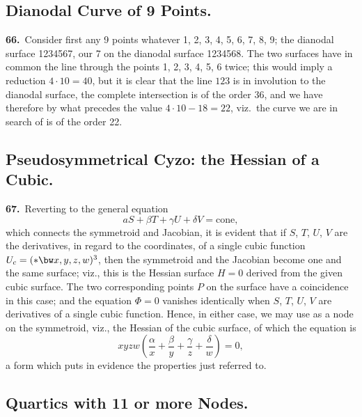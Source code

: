 \documentclass[11pt,a4paper]{article}
\begin{document}
\subsection*{Dianodal Curve of 9 Points.}

\noindent\textbf{66.}\ Consider first any 9 points whatever 1, 2, 3, 4, 5, 6, 7, 8, 9; the dianodal surface 1234567, our 7 on the dianodal surface 1234568. The two surfaces have in common the line through the points 1, 2, 3, 4, 5, 6 twice; this would imply a reduction $4 \cdot 10 = 40$, but it is clear that the line $123$ is in involution to the dianodal surface, the complete intersection is of the order 36, and we have therefore by what precedes the value $4 \cdot 10 - 18 = 22$, viz.\ the curve we are in search of is of the order 22.

\subsection*{Pseudosymmetrical Cyzo: the Hessian of a Cubic.}

\noindent\textbf{67.}\ Reverting to the general equation
\[
aS + \beta T + \gamma U + \delta V = \text{cone},
\]
which connects the symmetroid and Jacobian, it is evident that if $S$, $T$, $U$, $V$ are the derivatives, in regard to the coordinates, of a single cubic function $U_c = (\ast \bw x, y, z, w)^3$, then the symmetroid and the Jacobian become one and the same surface; viz., this is the Hessian surface $H = 0$ derived from the given cubic surface. The two corresponding points $P$ on the surface have a coincidence in this case; and the equation $\Phi = 0$ vanishes identically when $S$, $T$, $U$, $V$ are derivatives of a single cubic function. Hence, in either case, we may use as a node on the symmetroid, viz., the Hessian of the cubic surface, of which the equation is
\[
xyzw\left(\frac{\alpha}{x} + \frac{\beta}{y} + \frac{\gamma}{z} + \frac{\delta}{w}\right) = 0,
\]
a form which puts in evidence the properties just referred to.

\newpage
\setcounter{page}{158}

\subsection*{Quartics with 11 or more Nodes.}
\end{document}

